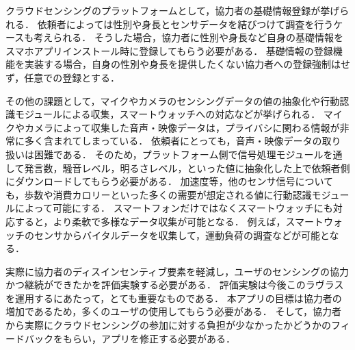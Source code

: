 クラウドセンシングのプラットフォームとして，協力者の基礎情報登録が挙げられる．
依頼者によっては性別や身長とセンサデータを結びつけて調査を行うケースも考えられる．
そうした場合，協力者に性別や身長など自身の基礎情報をスマホアプリインストール時に登録してもらう必要がある．
基礎情報の登録機能を実装する場合，自身の性別や身長を提供したくない協力者への登録強制はせず，任意での登録とする．

その他の課題として，マイクやカメラのセンシングデータの値の抽象化や行動認識モジュールによる収集，スマートウォッチへの対応などが挙げられる．
マイクやカメラによって収集した音声・映像データは，プライバシに関わる情報が非常に多く含まれてしまっている．
依頼者にとっても，音声・映像データの取り扱いは困難である．
そのため，プラットフォーム側で信号処理モジュールを通して発言数，騒音レベル，明るさレベル，といった値に抽象化した上で依頼者側にダウンロードしてもらう必要がある．
加速度等，他のセンサ信号についても，歩数や消費カロリーといった多くの需要が想定される値に行動認識モジュールによって可能にする．
スマートフォンだけではなくスマートウォッチにも対応すると，より柔軟で多様なデータ収集が可能となる．
例えば，スマートウォッチのセンサからバイタルデータを収集して，運動負荷の調査などが可能となる．

実際に協力者のディスインセンティブ要素を軽減し，ユーザのセンシングの協力かつ継続ができたかを評価実験する必要がある．
評価実験は今後このラヴラスを運用するにあたって，とても重要なものである．
本アプリの目標は協力者の増加であるため，多くのユーザの使用してもらう必要がある．
そして，協力者から実際にクラウドセンシングの参加に対する負担が少なかったかどうかのフィードバックをもらい，アプリを修正する必要がある．


